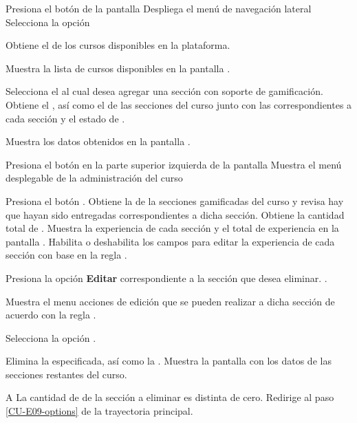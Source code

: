 \begin{UCtrayectoria}%
%
  \Actor Presiona el botón \IUMenu de la pantalla 
  \Sistema Despliega el menú de navegación lateral
  \Actor Selecciona la opción 

  \Sistema Obtiene el  de los cursos disponibles en la
           plataforma.

  \Sistema Muestra la lista de cursos disponibles en la pantalla .

  \Actor Selecciona el  al cual desea agregar una sección con
         soporte de gamificación.
  \Sistema Obtiene el , 
           así como el  de las secciones
           del curso junto con las 
           correspondientes a cada sección y el estado de .

  \Sistema Muestra los datos obtenidos en la pantalla .
           \label{CU-E07-pantalla}

  \Actor Presiona el botón \IUAdminSitio en la parte superior izquierda de la pantalla
  \Sistema Muestra el menú desplegable de la administración del curso

  \Actor Presiona el botón . 
  \Sistema Obtiene la  de la secciones gamificadas del
           curso y revisa hay  que hayan sido
           entregadas correspondientes a dicha sección.
  \Sistema Obtiene la cantidad total de .
  \Sistema Muestra la experiencia de cada sección y el total de experiencia
           en la pantalla .
  \Sistema Habilita o deshabilita los campos para editar la experiencia de cada
           sección con base en la regla .

  \Actor Presiona la opción {\bf Editar} correspondiente a la 
         sección que desea eliminar. \label{CU-E09-options}.

  \Sistema Muestra el menu acciones de edición que se pueden realizar a dicha sección de
           acuerdo con la regla .  

  \Actor Selecciona la opción .

  \Sistema Elimina la  especificada, así como la
           .
  \Sistema Muestra la pantalla  con los datos de las secciones restantes
           del curso.

\end{UCtrayectoria}

\begin{UCtrayectoriaA}{A}{%
La cantidad de  de la sección a eliminar es distinta de cero.
}
  \Sistema Redirige al paso \ref{CU-E09-options} de la trayectoria principal.
\end{UCtrayectoriaA}
